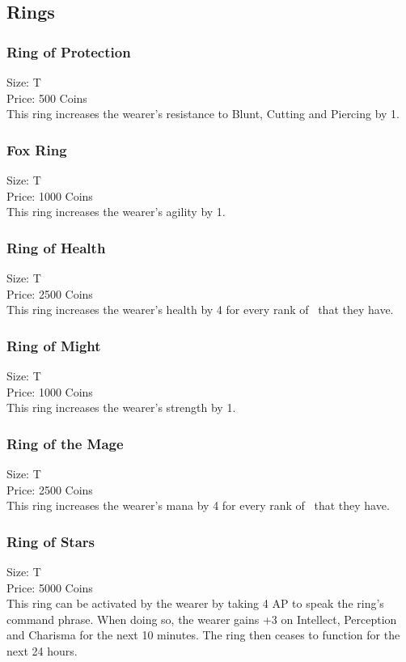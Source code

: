 \subsection{Rings}\label{subsec:rings}

\subsubsection{Ring of Protection}\label{item:ringOfProtection}
Size: T\\
Price: 500 Coins\\
This ring increases the wearer's resistance to Blunt, Cutting and Piercing by 1.

\subsubsection{Fox Ring}\label{item:ringOfFox}
Size: T\\
Price: 1000 Coins\\
This ring increases the wearer's agility by 1.

\subsubsection{Ring of Health}\label{item:ringOfHealth}
Size: T\\
Price: 2500 Coins\\
This ring increases the wearer's health by 4 for every rank of~ that they have.

\subsubsection{Ring of Might}\label{item:ringOfMight}
Size: T\\
Price: 1000 Coins\\
This ring increases the wearer's strength by 1.

\subsubsection{Ring of the Mage}\label{item:ringOfMage}
Size: T\\
Price: 2500 Coins\\
This ring increases the wearer's mana by 4 for every rank of~ that they have.

\subsubsection{Ring of Stars}\label{item:ringOfStars}
Size: T\\
Price: 5000 Coins\\
This ring can be activated by the wearer by taking 4 AP to speak the ring's command phrase.
When doing so, the wearer gains +3 on Intellect, Perception and Charisma for the next 10 minutes.
The ring then ceases to function for the next 24 hours.